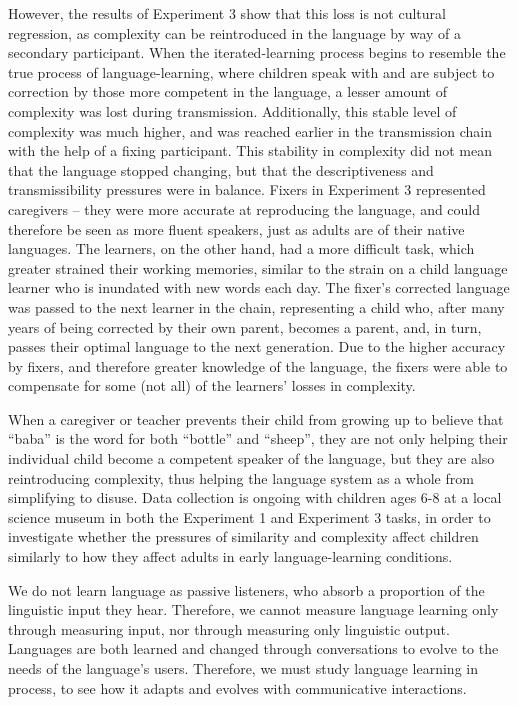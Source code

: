 \documentclass[10pt, letterpaper]{article}
\begin{document}
However, the results of Experiment 3 show that this loss is not cultural
regression, as complexity can be reintroduced in the language by way of
a secondary participant. When the iterated-learning process begins to
resemble the true process of language-learning, where children speak
with and are subject to correction by those more competent in the
language, a lesser amount of complexity was lost during transmission.
Additionally, this stable level of complexity was much higher, and was
reached earlier in the transmission chain with the help of a fixing
participant. This stability in complexity did not mean that the language
stopped changing, but that the descriptiveness and transmissibility
pressures were in balance. Fixers in Experiment 3 represented caregivers
-- they were more accurate at reproducing the language, and could
therefore be seen as more fluent speakers, just as adults are of their
native languages. The learners, on the other hand, had a more difficult
task, which greater strained their working memories, similar to the
strain on a child language learner who is inundated with new words each
day. The fixer's corrected language was passed to the next learner in
the chain, representing a child who, after many years of being corrected
by their own parent, becomes a parent, and, in turn, passes their
optimal language to the next generation. Due to the higher accuracy by
fixers, and therefore greater knowledge of the language, the fixers were
able to compensate for some (not all) of the learners' losses in
complexity.

When a caregiver or teacher prevents their child from growing up to
believe that ``baba'' is the word for both ``bottle'' and ``sheep'',
they are not only helping their individual child become a competent
speaker of the language, but they are also reintroducing complexity,
thus helping the language system as a whole from simplifying to disuse.
Data collection is ongoing with children ages 6-8 at a local science
museum in both the Experiment 1 and Experiment 3 tasks, in order to
investigate whether the pressures of similarity and complexity affect
children similarly to how they affect adults in early language-learning
conditions.

We do not learn language as passive listeners, who absorb a proportion
of the linguistic input they hear. Therefore, we cannot measure language
learning only through measuring input, nor through measuring only
linguistic output. Languages are both learned and changed through
conversations to evolve to the needs of the language's users. Therefore,
we must study language learning in process, to see how it adapts and
evolves with communicative interactions.
\end{document}
